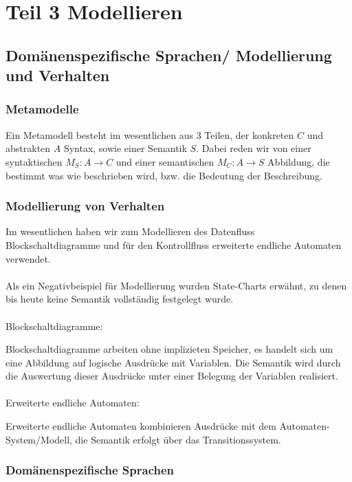 \section{Teil 3 Modellieren}

\subsection{Domänenspezifische Sprachen/ Modellierung und Verhalten}

\subsubsection{Metamodelle}

Ein Metamodell besteht im wesentlichen aus 3 Teilen,
der konkreten $C$ und abstrakten $A$ Syntax, sowie einer Semantik $S$.
Dabei reden wir von einer syntaktischen $M_S: A \rightarrow C$ und einer semantischen $M_C: A \rightarrow S$ Abbildung,
die bestimmt was wie beschrieben wird, bzw. die Bedeutung der Beschreibung.

\subsubsection{Modellierung von Verhalten}

Im wesentlichen haben wir zum Modellieren des Datenfluss Blockschaltdiagramme und für den Kontrollfluss
erweiterte endliche Automaten verwendet.
\\ \\
Als ein Negativbeispiel für Modellierung wurden State-Charts erwähnt, zu denen bis heute keine Semantik vollständig 
festgelegt wurde.
\\ \\
Blockschaltdiagramme:

Blockschaltdiagramme arbeiten ohne implizieten Speicher, es handelt sich um eine Abbildung auf logische Ausdrücke mit 
Variablen. Die Semantik wird durch die Auswertung dieser Ausdrücke unter einer Belegung der Variablen realisiert.
\\ \\
Erweiterte endliche Automaten:

Erweiterte endliche Automaten kombinieren Ausdrücke mit dem Automaten-System/Modell, die Semantik erfolgt über das 
Transitionssystem.

\subsubsection{Domänenspezifische Sprachen}

